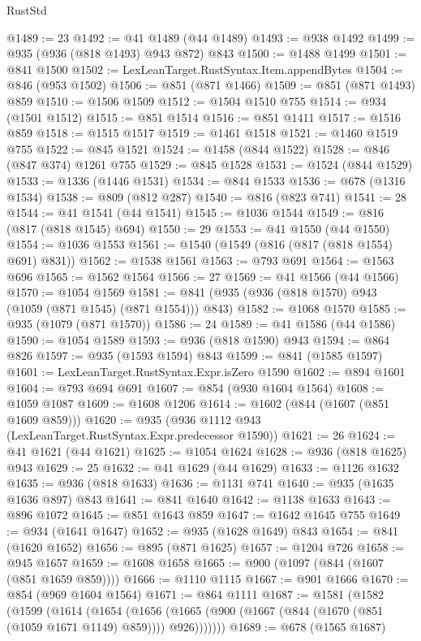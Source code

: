 \begin{lexlean}{RustStd}
\begin{coremodule}
@1489 := 23
@1492 := @41 @1489 (@44 @1489)
@1493 := @938 @1492
@1499 := @935 (@936 (@818 @1493) @943 @872) @843
@1500 := @1488 @1499
@1501 := @841 @1500
@1502 := LexLeanTarget.RustSyntax.Item.appendBytes
@1504 := @846 (@953 @1502)
@1506 := @851 (@871 @1466)
@1509 := @851 (@871 @1493) @859
@1510 := @1506 @1509
@1512 := @1504 @1510 @755
@1514 := @934 (@1501 @1512)
@1515 := @851 @1514
@1516 := @851 @1411
@1517 := @1516 @859
@1518 := @1515 @1517
@1519 := @1461 @1518
@1521 := @1460 @1519 @755
@1522 := @845 @1521
@1524 := @1458 (@844 @1522)
@1528 := @846 (@847 @374) @1261 @755
@1529 := @845 @1528
@1531 := @1524 (@844 @1529)
@1533 := @1336 (@1446 @1531)
@1534 := @844 @1533
@1536 := @678 (@1316 @1534)
@1538 := @809 (@812 @287)
@1540 := @816 (@823 @741)
@1541 := 28
@1544 := @41 @1541 (@44 @1541)
@1545 := @1036 @1544
@1549 := @816 (@817 (@818 @1545) @694)
@1550 := 29
@1553 := @41 @1550 (@44 @1550)
@1554 := @1036 @1553
@1561 := @1540 (@1549 (@816 (@817 (@818 @1554) @691) @831))
@1562 := @1538 @1561
@1563 := @793 @691
@1564 := @1563 @696
@1565 := @1562 @1564
@1566 := 27
@1569 := @41 @1566 (@44 @1566)
@1570 := @1054 @1569
@1581 := @841 (@935 (@936 (@818 @1570) @943 (@1059 (@871 @1545) (@871 @1554))) @843)
@1582 := @1068 @1570
@1585 := @935 (@1079 (@871 @1570))
@1586 := 24
@1589 := @41 @1586 (@44 @1586)
@1590 := @1054 @1589
@1593 := @936 (@818 @1590) @943
@1594 := @864 @826
@1597 := @935 (@1593 @1594) @843
@1599 := @841 (@1585 @1597)
@1601 := LexLeanTarget.RustSyntax.Expr.isZero @1590
@1602 := @894 @1601
@1604 := @793 @694 @691
@1607 := @854 (@930 @1604 @1564)
@1608 := @1059 @1087
@1609 := @1608 @1206
@1614 := @1602 (@844 (@1607 (@851 @1609 @859)))
@1620 := @935 (@936 @1112 @943 (LexLeanTarget.RustSyntax.Expr.predecessor @1590))
@1621 := 26
@1624 := @41 @1621 (@44 @1621)
@1625 := @1054 @1624
@1628 := @936 (@818 @1625) @943
@1629 := 25
@1632 := @41 @1629 (@44 @1629)
@1633 := @1126 @1632
@1635 := @936 (@818 @1633)
@1636 := @1131 @741
@1640 := @935 (@1635 @1636 @897) @843
@1641 := @841 @1640
@1642 := @1138 @1633
@1643 := @896 @1072
@1645 := @851 @1643 @859
@1647 := @1642 @1645 @755
@1649 := @934 (@1641 @1647)
@1652 := @935 (@1628 @1649) @843
@1654 := @841 (@1620 @1652)
@1656 := @895 (@871 @1625)
@1657 := @1204 @726
@1658 := @945 @1657
@1659 := @1608 @1658
@1665 := @900 (@1097 (@844 (@1607 (@851 @1659 @859))))
@1666 := @1110 @1115
@1667 := @901 @1666
@1670 := @854 (@969 @1604 @1564)
@1671 := @864 @1111
@1687 := @1581
    (@1582
      (@1599
        (@1614
          (@1654
            (@1656 (@1665 (@900 (@1667 (@844 (@1670 (@851 (@1059 @1671 @1149) @859)))) @926)))))))
@1689 := @678 (@1565 @1687)

\end{coremodule}
\end{lexlean}
